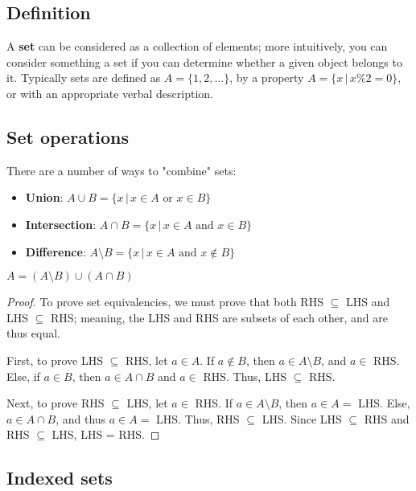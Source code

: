 \documentclass[12pt,oneside]{article}
\begin{document}
\subsection{Definition}
A \textbf{set} can be considered as a collection of elements; more intuitively, you can consider something a set if you can determine whether a given object belongs to it. Typically sets are defined as $A = \{1, 2, \dots\}$, by a property $A = \{x \,|\, x\%2 = 0\}$, or with an appropriate verbal description.

\subsection{Set operations}
There are a number of ways to "combine" sets:

\begin{itemize}
  \item \textbf{Union}: $A \cup B = \{x \,|\, x \in A \text{ or } x \in B\}$ 
  \item \textbf{Intersection}: $A \cap B = \{x \,|\, x \in A \text{ and } x \in B\}$ 
  \item \textbf{Difference}: $A \setminus B = \{x \,|\, x \in A \text{ and } x \notin B\}$ 
\end{itemize}

\begin{lemma}
  $A = (A\setminus B)\cup(A\cap B)$
\end{lemma}
\begin{proof}
  To prove set equivalencies, we must prove that both RHS $\subseteq$ LHS and LHS $\subseteq$ RHS; meaning, the LHS and RHS are subsets of each other, and are thus equal.
  
  First, to prove LHS $\subseteq$ RHS, let $a \in A$. If $a \notin B$, then $a \in A\setminus B$, and $a \in$ RHS. Else, if $a \in B$, then $a \in A \cap B$ and $a \in$ RHS. Thus, LHS $\subseteq$ RHS.

  Next, to prove RHS $\subseteq$ LHS, let $a \in $ RHS. If $a \in A \setminus B$, then $a \in A=$ LHS. Else, $a \in A \cap B$, and thus $a \in A=$ LHS. Thus, RHS $\subseteq$ LHS.
  Since LHS $\subseteq$ RHS and RHS $\subseteq$ LHS, LHS = RHS.
\end{proof}

\subsection{Indexed sets}
\end{document}
